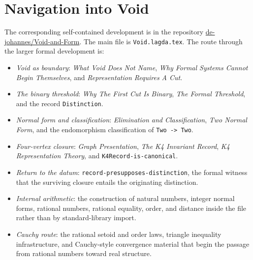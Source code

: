\documentclass[11pt]{article}
\begin{document}
\section{Navigation into Void}

The corresponding self-contained development is in the repository
\href{https://github.com/de-johannes/Void-and-Form}{de-johannes/Void-and-Form}.
The main file is \texttt{Void.lagda.tex}.  The route through the larger
formal development is:

\begin{itemize}
\item \emph{Void as boundary}: \emph{What Void Does Not Name},
  \emph{Why Formal Systems Cannot Begin Themselves}, and
  \emph{Representation Requires A Cut}.
\item \emph{The binary threshold}: \emph{Why The First Cut Is Binary},
  \emph{The Formal Threshold}, and the record \texttt{Distinction}.
\item \emph{Normal form and classification}: \emph{Elimination and
  Classification}, \emph{Two Normal Form}, and the endomorphism
  classification of \texttt{Two -> Two}.
\item \emph{Four-vertex closure}: \emph{Graph Presentation},
  \emph{The K4 Invariant Record}, \emph{K4 Representation Theory},
  and \texttt{K4Record-is-canonical}.
\item \emph{Return to the datum}: \texttt{record-presupposes-distinction},
  the formal witness that the surviving closure entails the originating
  distinction.
\item \emph{Internal arithmetic}: the construction of natural numbers,
  integer normal forms, rational numbers, rational equality, order, and
  distance inside the file rather than by standard-library import.
\item \emph{Cauchy route}: the rational setoid and order laws, triangle
  inequality infrastructure, and Cauchy-style convergence material that
  begin the passage from rational numbers toward real structure.
\end{itemize}
\end{document}
